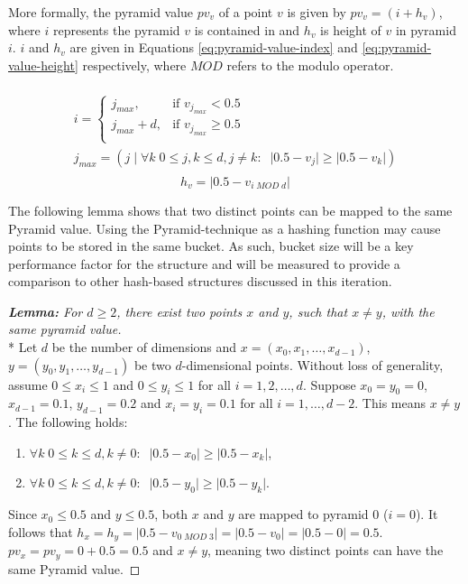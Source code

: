 \begin{figure}
		\label{fig:pyramid-tree-partition}
\end{figure}

More formally, the pyramid value $pv_v$ of a point $v$ is given by $pv_v = (i + h_v)$, where $i$ represents the pyramid $v$ is contained in and $h_v$ is height of $v$ in pyramid $i$. $i$ and $h_v$ are given in Equations \ref{eq:pyramid-value-index} and \ref{eq:pyramid-value-height} respectively, where $MOD$ refers to the modulo operator.

\begin{multline}\\
	i = \begin{cases}
		j_{max},         & \text{if }v_{j_{max}} < 0.5\\
		j_{max} + d,   & \text{if }v_{j_{max}} \geq 0.5\\
	\end{cases} \\
	j_{max} = \left( j \;|\; \forall k \; 0 \leq j,k \leq d, j \neq k: \;\; \lvert 0.5 - v_j \rvert \geq \lvert 0.5 - v_k \rvert \right) \\
	\label{eq:pyramid-value-index}
\end{multline}
\begin{equation}
	h_v = \lvert 0.5 - v_{i \; MOD \; d} \rvert
	\label{eq:pyramid-value-height}
\end{equation}

The following lemma shows that two distinct points can be mapped to the same Pyramid value. Using the Pyramid-technique as a hashing function may cause points to be stored in the same bucket. As such, bucket size will be a key performance factor for the structure and will be measured to provide a comparison to other hash-based structures discussed in this iteration.

\begin{proof}[\textbf{Lemma: } For $d \geq 2$, there exist two points $x$ and $y$, such that $x \neq y$, with the same pyramid value]\mbox{}\\*
Let $d$ be the number of dimensions and $x = (x_0, x_1, \dots, x_{d -1})$, $y = (y_0, y_1, \dots, y_{d - 1})$ be two $d$-dimensional points. Without loss of generality, assume $0 \leq x_i \leq 1$ and $0 \leq y_i \leq 1$ for all $i = 1, 2, \dots, d$. Suppose $x_0 = y_0 = 0$, $x_{d - 1} = 0.1$, $y_{d - 1} = 0.2$ and $x_i = y_i = 0.1$ for all $i = 1, \dots, {d - 2}$. This means $x \neq y$. The following holds:
\begin{enumerate}
	\item $\forall k \; 0 \leq k \leq d, k \neq 0: \;\; \lvert 0.5 - x_0 \rvert \geq \lvert 0.5 - x_k \rvert$,
	\item $\forall k \; 0 \leq k \leq d, k \neq 0: \;\; \lvert 0.5 - y_0 \rvert \geq \lvert 0.5 - y_k \rvert$.
\end{enumerate}
Since $x_0 \leq 0.5$ and $y \leq 0.5$, both $x$ and $y$ are mapped to pyramid 0 ($i = 0$). It follows that $h_x = h_y = \lvert 0.5 - v_{0 \; MOD \; 3} \rvert = \lvert 0.5 - v_{0} \rvert = \lvert 0.5 - 0 \rvert = 0.5$. $pv_x = pv_y = 0 + 0.5 = 0.5$ and $x \neq y$, meaning two distinct points can have the same Pyramid value.

\end{proof}

